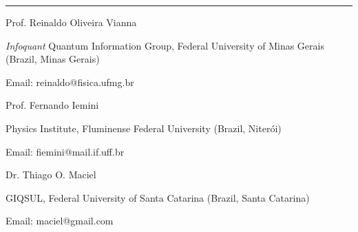 \documentclass[a4paper,10pt]{article}
\newlength{\cvcolumngapwidth}
\newlength{\cvleftcolumnwidth}
\newlength{\cvrightcolumnwidth}
\newcommand{\cvsectionstyle}[1]{{\normalsize\cvsectionfont\textcolor{cvsectioncolor}{#1}}}
\newcommand{\cvtitlestyle}[1]{{\normalsize\cvtitlefont\textcolor{cvtitlecolor}{#1}}}
\newcommand{\cvdurationstyle}[1]{{\normalsize\cvdurationfont\textcolor{cvdurationcolor}{#1}}}
\newlength{\cvafteritemskipamount}
\newlength{\cvaftersectionskipamount}
\newlength{\cvaftertitleskipamount}
\newlength{\cvparskip}
\newcommand{\cvsection}[1]{
    \begin{minipage}[t]{\cvleftcolumnwidth}
        \raggedleft\cvsectionstyle{#1}
    \end{minipage}%
    \hspace{\cvcolumngapwidth}%
    \begin{minipage}[t]{\cvrightcolumnwidth}
        \textcolor{cvrulecolor}{\rule{\cvrightcolumnwidth}{0.5mm}}
    \end{minipage}
    \vspace{\cvaftersectionskipamount}}
\newcommand{\cvitem}[2]{
    \begin{minipage}[t]{\cvleftcolumnwidth}
        \raggedleft #1
    \end{minipage}%
    \hspace{\cvcolumngapwidth}%
    \begin{minipage}[t]{\cvrightcolumnwidth}
        \setlength{\parskip}{\cvparskip} #2
    \end{minipage}
    \vspace{\cvafteritemskipamount}}
\newcommand{\cvtitle}[1]{
    \cvtitlestyle{#1}
    \vspace{\cvaftertitleskipamount}
    \vspace{-\cvparskip}}
\begin{document}
\cvsection{References}

\cvitem{\cvdurationstyle{}}
    {\cvtitle{Prof. Reinaldo Oliveira Vianna}
    
    \emph{Infoquant} Quantum Information Group, Federal University of Minas Gerais (Brazil, Minas Gerais)
    
    \vspace{0.2cm}
    Email: reinaldo@fisica.ufmg.br}

\cvitem{\cvdurationstyle{}}
    {\cvtitle{Prof. Fernando Iemini}
    
    Physics Institute, Fluminense Federal University (Brazil, Niter\'oi)
    
    \vspace{0.2cm}
    Email: fiemini@mail.if.uff.br}

\cvitem{\cvdurationstyle{}}
    {\cvtitle{Dr. Thiago O. Maciel}
    
    GIQSUL, Federal University of Santa Catarina (Brazil, Santa Catarina)
    
    \vspace{0.2cm}
    Email: maciel@gmail.com}
\end{document}

